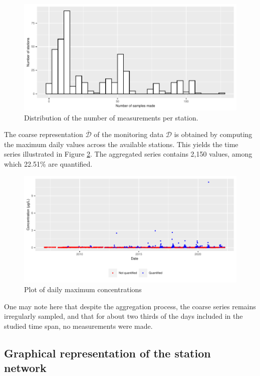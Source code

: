 \begin{figure}[ht]
  \centering
  \includegraphics[]{figs/Chap5/hist_samp_sta.pdf}
  \caption{Distribution of the number of measurements per station.}
  \label{fig:histogram}
\end{figure}

The coarse representation $\overline{\mathcal{D}}$ of the monitoring data $\mathcal{D}$ is obtained by computing the maximum daily values across the available stations. This yields the time series illustrated in Figure \ref{time:serie}. The aggregated series contains 2,150 values, among which 22.51\% are quantified. 

\begin{figure}[ht]
  \centering
  \includegraphics[]{figs/Chap5/Max_temp-1.pdf}
  \caption{Plot of daily maximum concentrations}
  \label{time:serie}
\end{figure}

One may note here that despite the aggregation process, the coarse series remains irregularly sampled, and that for about two thirds of the days included in the studied time span, no measurements were made. 

\subsection{Graphical representation of the station network}\label{subsection:graph:construct}

